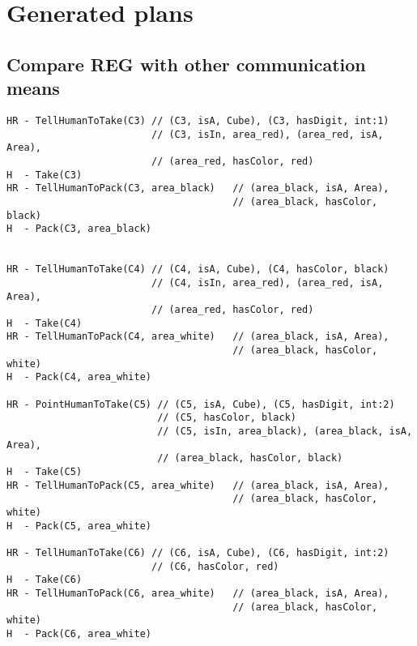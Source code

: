 \chapter{Generated plans}
\label{app:plans}

\section{Compare REG with other communication means}

\begin{lstlisting}[frame=single, basicstyle=\scriptsize\ttfamily, label={lst:chap5_case3}, caption={The \acrshort{hatp} solution for the third case study of the chapter \ref{chap:5}. The robot chooses to point instead of verbalizing to designate the cubes 5 and 7. Please note the order of cube motions is not considered in this problem. The lines beginning with H represent the actions of the human and the lines beginning with HR represent actions involving the human and the robot (communication actions). In green are the \acrshort{reg} results for each communication action even if a pointing has been choose.}, captionpos=t, style=HatpPlan]
HR - TellHumanToTake(C3) // (C3, isA, Cube), (C3, hasDigit, int:1)
                         // (C3, isIn, area_red), (area_red, isA, Area),
                         // (area_red, hasColor, red)
H  - Take(C3)
HR - TellHumanToPack(C3, area_black)   // (area_black, isA, Area),
                                       // (area_black, hasColor, black)
H  - Pack(C3, area_black)


HR - TellHumanToTake(C4) // (C4, isA, Cube), (C4, hasColor, black)
                         // (C4, isIn, area_red), (area_red, isA, Area),
                         // (area_red, hasColor, red)
H  - Take(C4)
HR - TellHumanToPack(C4, area_white)   // (area_black, isA, Area),
                                       // (area_black, hasColor, white)
H  - Pack(C4, area_white)

HR - PointHumanToTake(C5) // (C5, isA, Cube), (C5, hasDigit, int:2)
                          // (C5, hasColor, black)
                          // (C5, isIn, area_black), (area_black, isA, Area),
                          // (area_black, hasColor, black)
H  - Take(C5)
HR - TellHumanToPack(C5, area_white)   // (area_black, isA, Area),
                                       // (area_black, hasColor, white)
H  - Pack(C5, area_white)

HR - TellHumanToTake(C6) // (C6, isA, Cube), (C6, hasDigit, int:2)
                         // (C6, hasColor, red)
H  - Take(C6)
HR - TellHumanToPack(C6, area_white)   // (area_black, isA, Area),
                                       // (area_black, hasColor, white)
H  - Pack(C6, area_white)


\end{lstlisting}
